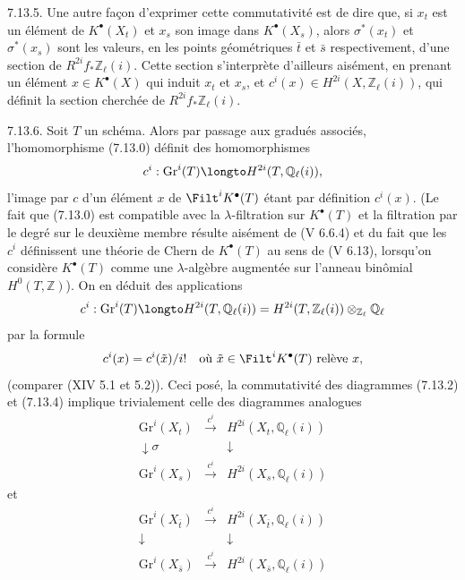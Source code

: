 7.13.5. Une autre fa\c con d'exprimer cette commutativit\'e est de dire que, si $x_{t}$ est un \'el\'ement de $K^{\bullet}(X_{t})$ et $x_{s}$ son image dans $K^{\bullet}(X_{s})$, alors $\sigma^{*}(x_{t})$ et $\sigma^{*}(x_{s})$ sont les valeurs, en les points g\'eom\'etriques $\bar{t}$ et $\bar{s}$ respectivement, d'une section de $R^{2i}f_{*}\mathbb{Z}_{\ell}(i)$. Cette section s'interpr\`ete d'ailleurs ais\'ement, en prenant un \'el\'ement $x \in K^{\bullet}(X)$ qui induit $x_{t}$ et $x_{s}$, et $c^{i}(x) \in H^{2i}(X, \mathbb{Z}_{\ell}(i))$, qui d\'efinit la section cherch\'ee de $R^{2i}f_{*}\mathbb{Z}_{\ell}(i)$.

7.13.6. Soit $T$ un sch\'ema. Alors par passage aux gradu\'es associ\'es, l'homomorphisme (7.13.0) d\'efinit des homomorphismes
\[
c^{i} : \mathrm{Gr}^{i}(T) \longto H^{2i}(T, \mathbb{Q}_{\ell}(i)),
\]
l'image par $c$ d'un \'el\'ement $x$ de $\Filt^{i}K^{\bullet}(T)$ \'etant par d\'efinition $c^{i}(x)$. (Le fait que (7.13.0) est compatible avec la $\lambda$-filtration sur $K^{\bullet}(T)$ et la filtration par le degr\'e sur le deuxi\`eme membre r\'esulte ais\'ement de (V 6.6.4) et du fait que les $c^{i}$ d\'efinissent une th\'eorie de Chern de $K^{\bullet}(T)$ au sens de (V 6.13), lorsqu'on consid\`ere $K^{\bullet}(T)$ comme une $\lambda$-alg\`ebre augment\'ee sur l'anneau bin\^omial $H^{0}(T, \mathbb{Z})$). On en d\'eduit des applications
\begin{equation}\label{eq:7.13.7}
c^{i} : \mathrm{Gr}^{i}(T) \longto H^{2i}(T, \mathbb{Q}_{\ell}(i)) = H^{2i}(T, \mathbb{Z}_{\ell}(i)) \otimes_{\mathbb{Z}_{\ell}} \mathbb{Q}_{\ell}
\end{equation}
par la formule
\begin{equation}\label{eq:7.13.8}
c^{i}(x) = c^{i}(\tilde{x}) / i! \quad \text{o\`u } \tilde{x} \in \Filt^{i}K^{\bullet}(T) \text{ rel\`eve } x,
\end{equation}
(comparer (XIV 5.1 et 5.2)). Ceci pos\'e, la commutativit\'e des diagrammes (7.13.2) et (7.13.4) implique trivialement celle des diagrammes analogues
\begin{equation}\label{eq:7.13.9}
\begin{array}{ccc}
\mathrm{Gr}^{i}(X_{t}) & \xrightarrow{\,c^{i}\,} & H^{2i}(X_{t}, \mathbb{Q}_{\ell}(i)) \\
\downarrow{\scriptstyle \sigma} & & \downarrow \\
\mathrm{Gr}^{i}(X_{s}) & \xrightarrow{\,c^{i}\,} & H^{2i}(X_{s}, \mathbb{Q}_{\ell}(i))
\end{array}
\end{equation}
et
\begin{equation}\label{eq:7.13.10}
\begin{array}{ccc}
\mathrm{Gr}^{i}(X_{\bar{t}}) & \xrightarrow{\,c^{i}\,} & H^{2i}(X_{\bar{t}}, \mathbb{Q}_{\ell}(i)) \\
\downarrow & & \downarrow \\
\mathrm{Gr}^{i}(X_{\bar{s}}) & \xrightarrow{\,c^{i}\,} & H^{2i}(X_{\bar{s}}, \mathbb{Q}_{\ell}(i))
\end{array}
\end{equation}

